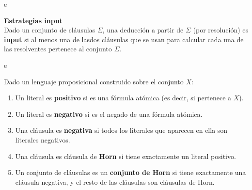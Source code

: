 \begin{ejemplo}
    e
\end{ejemplo}

\underline{\textbf{Estrategias input}} \\

Dado un conjunto de cláusulas $\Sigma$, una deducción a partir de $\Sigma$ (por resolución) es \textbf{input} si al menos una de lasdos cláusulas que se usan para calcular cada una de las resolventes pertenece al conjunto $\Sigma$.

\begin{ejemplo}
    e
\end{ejemplo}

\begin{ndef}
    Dado un lenguaje proposicional construido sobre el conjunto $X$:
    \begin{enumerate}
        \item Un literal es \textbf{positivo} si es una fórmula atómica (es decir, si pertenece a $X$).
        \item Un literal es \textbf{negativo} si es el negado de una fórmula atómica.
        \item Una cláusula es \textbf{negativa} si todos los literales que aparecen en ella son literales negativos.
        \item Una cláusula es cláusula de \textbf{Horn} si tiene exactamente un literal positivo.
        \item Un conjunto de cláusulas es un \textbf{conjunto de Horn} si tiene exactamente una cláusula negativa, y el resto de las cláusulas son cláusulas de Horn.
    \end{enumerate}
\end{ndef}

